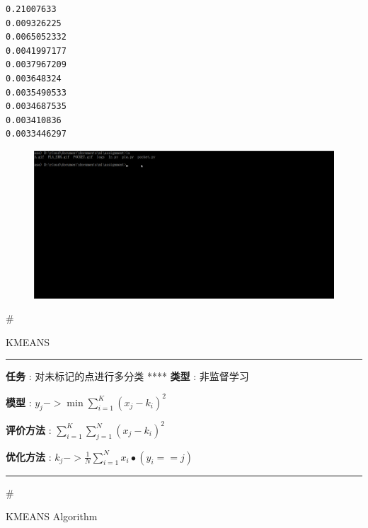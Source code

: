 \documentclass[11pt]{article}
\makeatletter
\def\maxwidth{\ifdim\Gin@nat@width>\linewidth\linewidth
    \else\Gin@nat@width\fi}
\let\Oldincludegraphics\includegraphics
\renewcommand{\includegraphics}[1]{\Oldincludegraphics[width=.8\maxwidth]{#1}}
\makeatother
\begin{document}
    \begin{Verbatim}[commandchars=\\\{\}]
0.21007633
0.009326225
0.0065052332
0.0041997177
0.0037967209
0.003648324
0.0035490533
0.0034687535
0.003410836
0.0033446297

    \end{Verbatim}

    \begin{figure}
\centering
\includegraphics{assignment/lr/tf_lr.gif}
\caption{}
\end{figure}

    \#

KMEANS

\begin{center}\rule{0.5\linewidth}{\linethickness}\end{center}

\textbf{任务} : 对未标记的点进行多分类 **** \textbf{类型} : 非监督学习

\textbf{模型} :
\({y_j} - > \min \sum\limits_{i = 1}^K {{{({x_j} - {k_i})}^2}}\)

\textbf{评价方法} :
\(\sum\limits_{i = 1}^K {\sum\limits_{j = 1}^N {{{({x_j} - {k_i})}^2}} }\)

\textbf{优化方法} :
\({k_j} - > \frac{1}{N}\sum\limits_{i = 1}^N {{x_i} \bullet ({y_i} = = j)}\)

    \begin{center}\rule{0.5\linewidth}{\linethickness}\end{center}

\#

KMEANS Algorithm
\end{document}
